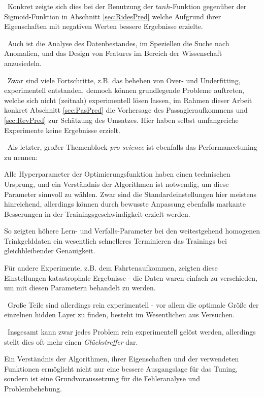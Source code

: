 ~\newline  Konkret zeigte sich dies bei der Benutzung der $tanh$-Funktion gegenüber der Sigmoid-Funktion in Abschnitt \ref{sec:RidesPred} welche Aufgrund ihrer Eigenschaften mit negativen Werten bessere Ergebnisse erzielte. 

~\newline Auch ist die Analyse des Datenbestandes, im Speziellen die Suche nach Anomalien, und das Design von Features im Bereich der Wissenschaft anzusiedeln. 

~\newline Zwar sind viele Fortschritte, z.B. das beheben von Over- und Underfitting, experimentell entstanden, dennoch können 
grundlegende Probleme auftreten, welche sich nicht (zeitnah) experimentell lösen lassen, im Rahmen dieser Arbeit konkret Abschnitt \ref{sec:PasPred} die Vorhersage des Passagieraufkommens und \ref{sec:RevPred} zur Schätzung des Umsatzes. Hier haben selbst umfangreiche Experimente keine Ergebnisse erzielt.

~\newline  Als letzter, großer Themenblock \textit{pro science} ist ebenfalls das Performancetuning zu nennen: 

Alle Hyperparameter der Optimierungsfunktion haben einen technischen Ursprung, und ein Verständnis der Algorithmen ist notwendig, um diese Parameter sinnvoll zu wählen. Zwar sind die Standardeinstellungen hier meistens hinreichend, allerdings können durch bewusste Anpassung ebenfalls markante Besserungen in der Trainingsgeschwindigkeit erzielt werden. 

So zeigten höhere Lern- und Verfalls-Parameter bei den weitestgehend homogenen Trinkgelddaten ein wesentlich schnelleres Terminieren das Trainings bei gleichbleibender Genauigkeit. 

Für andere Experimente, z.B. dem Fahrtenaufkommen, zeigten diese Einstellungen katastrophale Ergebnisse - die Daten waren einfach zu verschieden, um mit diesen Parametern behandelt zu werden. 

~\newline Große Teile sind allerdings rein experimentell - vor allem die optimale Größe der einzelnen hidden Layer zu finden, besteht im Wesentlichen aus Versuchen.

~\newline Insgesamt kann zwar jedes Problem rein experimentell gelöst werden, allerdings stellt dies oft mehr einen \textit{Glückstreffer} dar. 

Ein Verständnis der Algorithmen, ihrer Eigenschaften und der verwendeten Funktionen ermöglicht nicht nur eine bessere Ausgangslage für das Tuning, sondern ist eine Grundvoraussetzung für die Fehleranalyse und Problembehebung. 

